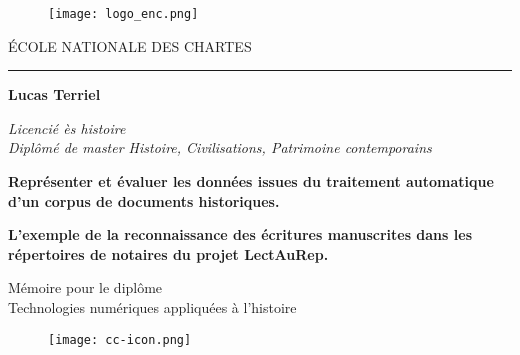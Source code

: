 \begin{titlepage}
    \begin{center}
    
\begin{figure}[h]
    \centering
    \centerline{\texttt{[image: logo\_enc.png]}}
\end{figure}

        \bigskip
    
        \begin{large}
            \'ECOLE NATIONALE DES CHARTES 
        \end{large}
    
        \begin{center}
            \rule{4cm}{0.02cm}
        \end{center}
    
        \hugeskip
        
        \begin{Large}
             \textbf{Lucas Terriel}\\
        \end{Large}
        \begin{normalsize}
            \textit{Licencié ès histoire}\\
            \textit{Diplômé de master 
            Histoire, Civilisations, Patrimoine contemporains}\\
        \end{normalsize}
        
        \hugeskip
        \bigskip
        
        \begin{LARGE}
            \textbf{Représenter et évaluer les données issues du traitement automatique d'un corpus de documents historiques.}
            
        \end{LARGE}
        \bigskip
        \bigskip
        \bigskip
        \bigskip
        \begin{large}
            \textbf{L'exemple de la reconnaissance des écritures manuscrites dans les répertoires de notaires du projet LectAuRep.}\\
        \end{large}
        
        \hugeskip
        \vfill
        
        
        
        \begin{large}
            Mémoire pour le diplôme\\
            \og Technologies numériques appliquées à l'histoire \fg\\
        \end{large}
        
        \begin{figure}[H]
            \centering
            \texttt{[image: cc-icon.png]}
            \label{traitement}
        \end{figure}
        
    \end{center}
\end{titlepage}

\thispagestyle{empty}
\cleardoublepage